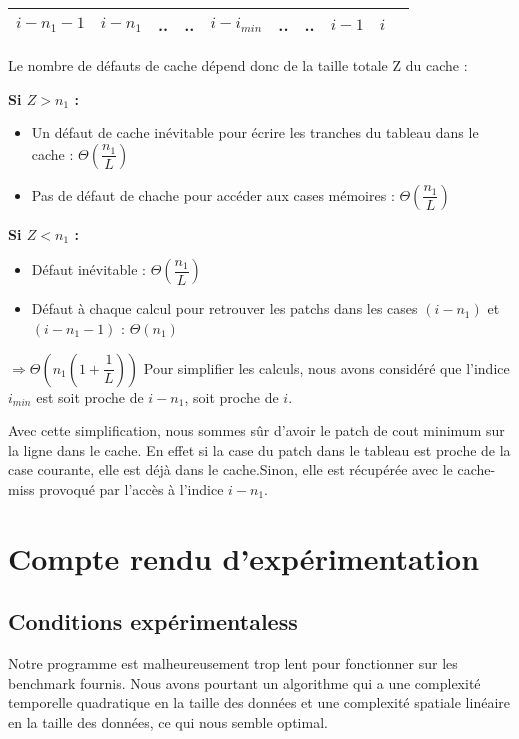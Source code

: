 \documentclass[a4paper, 10pt, french]{article}
\begin{document}
    \begin{tabular}{|c|c|c|c|c|c|c|c|c|c|}
    	\hline

    	 $i - n_1 - 1$ & $i - n_1$  &  .. & .. & $i - i_{min}$ & .. & .. & $i - 1$ & $i$ \\

    	\hline
    \end{tabular}

	Le nombre de défauts de cache dépend donc de la taille totale Z du cache :

	\textbf{Si $Z > n_1$ :}
    \begin{itemize}
		 \item Un défaut de cache inévitable pour écrire les tranches du tableau dans le cache : $\Theta(\dfrac{n_1}{L})$
		 \item Pas de défaut de chache pour accéder aux cases mémoires : $\Theta(\dfrac{n_1}{L})$
     \end{itemize}

	\textbf{Si $Z < n_1$ :}
    \begin{itemize}
	    \item Défaut inévitable : $\Theta(\dfrac{n_1}{L})$
	    \item Défaut à chaque calcul pour retrouver les patchs dans les cases $(i - n_1)$ et  $(i - n_1 - 1)$ : $\Theta(n_1)$
    \end{itemize}

 	$\Rightarrow \Theta(n_1 (1 + \dfrac{1}{L}) )$
 	Pour simplifier les calculs, nous avons considéré que l'indice $i_{min}$ est soit proche de $i - n_1$, soit proche de $i$.

 	Avec cette simplification, nous sommes sûr d'avoir le patch de cout minimum sur la ligne dans le cache. En effet si la case du patch dans
 	le tableau est proche
 	de la case courante,  elle est déjà dans le cache.Sinon, elle est récupérée avec le cache-miss provoqué par l'accès à l'indice
 	$i - n_1$.

\section{Compte rendu d'expérimentation}
  \subsection{Conditions expérimentaless}
    Notre programme est malheureusement trop lent pour fonctionner sur les benchmark fournis.
    Nous avons pourtant un algorithme qui a une complexité temporelle quadratique
    en la taille des données et une complexité spatiale linéaire en la taille des données,
    ce qui nous semble optimal.
\end{document}
